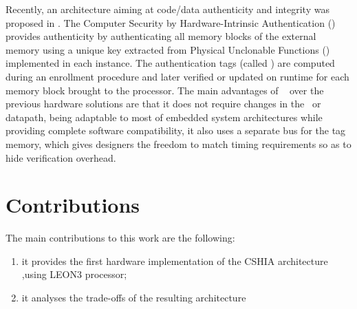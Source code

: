 Recently, an architecture aiming at code/data authenticity and integrity was proposed in \cite{Hoffman2015}. The Computer Security by Hardware-Intrinsic Authentication (\cshia) provides authenticity by authenticating all memory blocks of the external memory using a unique key extracted from Physical Unclonable Functions (\pufs) implemented in each instance. The authentication tags (called \ptags) are computed during an enrollment procedure and later verified or updated on runtime for each memory block brought to the processor. The main advantages of \cshia~ over the previous hardware solutions are that it does not require changes in the \isa~or datapath, being adaptable to most of embedded system architectures while providing complete software compatibility, it also uses a separate bus for the tag memory, which gives designers the freedom to match timing requirements so as to hide verification overhead.







\section{Contributions}
\label{sec:contributions}
The main contributions to this work are the following: 
\begin{enumerate}[label=(\alph*)]
    \item it provides the first hardware implementation of the CSHIA architecture ,using LEON3 processor;
    \item it analyses the trade-offs of the resulting architecture 
\end{enumerate}

